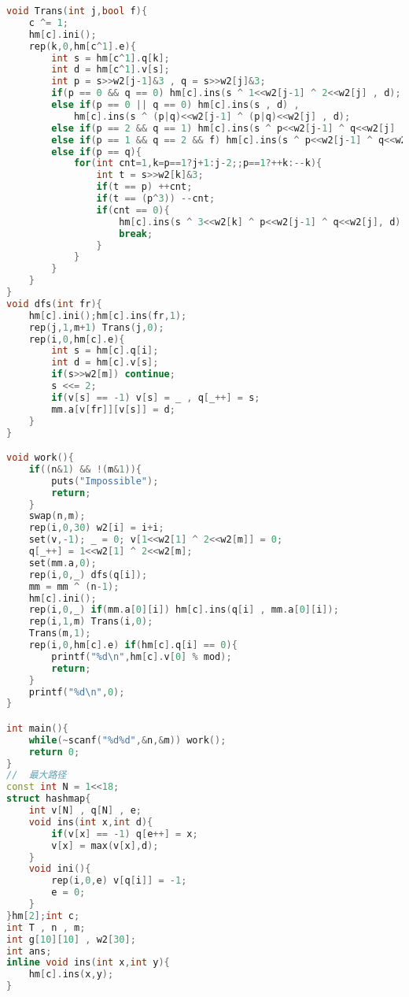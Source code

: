 \begin{lstlisting}[language=C++]
void Trans(int j,bool f){
    c ^= 1;
    hm[c].ini();
    rep(k,0,hm[c^1].e){
        int s = hm[c^1].q[k];
        int d = hm[c^1].v[s];
        int p = s>>w2[j-1]&3 , q = s>>w2[j]&3;
        if(p == 0 && q == 0) hm[c].ins(s ^ 1<<w2[j-1] ^ 2<<w2[j] , d);
        else if(p == 0 || q == 0) hm[c].ins(s , d) ,
            hm[c].ins(s ^ (p|q)<<w2[j-1] ^ (p|q)<<w2[j] , d);
        else if(p == 2 && q == 1) hm[c].ins(s ^ p<<w2[j-1] ^ q<<w2[j] , d);
        else if(p == 1 && q == 2 && f) hm[c].ins(s ^ p<<w2[j-1] ^ q<<w2[j] , d);
        else if(p == q){
            for(int cnt=1,k=p==1?j+1:j-2;;p==1?++k:--k){
                int t = s>>w2[k]&3;
                if(t == p) ++cnt;
                if(t == (p^3)) --cnt;
                if(cnt == 0){
                    hm[c].ins(s ^ 3<<w2[k] ^ p<<w2[j-1] ^ q<<w2[j], d);
                    break;
                }
            }
        }
    }
}
void dfs(int fr){
    hm[c].ini();hm[c].ins(fr,1);
    rep(j,1,m+1) Trans(j,0);
    rep(i,0,hm[c].e){
        int s = hm[c].q[i];
        int d = hm[c].v[s];
        if(s>>w2[m]) continue;
        s <<= 2;
        if(v[s] == -1) v[s] = _ , q[_++] = s;
        mm.a[v[fr]][v[s]] = d;
    }
}

void work(){
    if((n&1) && !(m&1)){
        puts("Impossible");
        return;
    }
    swap(n,m);
    rep(i,0,30) w2[i] = i+i;
    set(v,-1); _ = 0; v[1<<w2[1] ^ 2<<w2[m]] = 0;
    q[_++] = 1<<w2[1] ^ 2<<w2[m];
    set(mm.a,0);
    rep(i,0,_) dfs(q[i]);
    mm = mm ^ (n-1);
    hm[c].ini();
    rep(i,0,_) if(mm.a[0][i]) hm[c].ins(q[i] , mm.a[0][i]);
    rep(i,1,m) Trans(i,0);
    Trans(m,1);
    rep(i,0,hm[c].e) if(hm[c].q[i] == 0){
        printf("%d\n",hm[c].v[0] % mod);
        return;
    }
    printf("%d\n",0);
}

int main(){
    while(~scanf("%d%d",&n,&m)) work();
    return 0;
}
//	最大路径
const int N = 1<<18;
struct hashmap{
    int v[N] , q[N] , e;
    void ins(int x,int d){
        if(v[x] == -1) q[e++] = x;
        v[x] = max(v[x],d);
    }
    void ini(){
        rep(i,0,e) v[q[i]] = -1;
        e = 0;
    }
}hm[2];int c;
int T , n , m;
int g[10][10] , w2[30];
int ans;
inline void ins(int x,int y){
    hm[c].ins(x,y);
}


\end{lstlisting}
